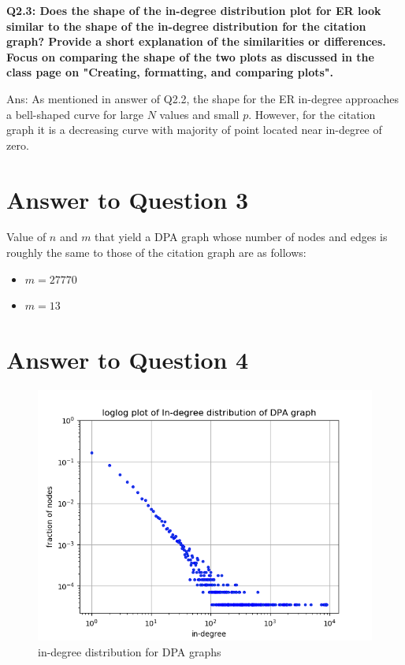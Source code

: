 \documentclass[a4paper]{article}
\begin{document}
\textbf{Q2.3: Does the shape of the in-degree distribution plot for ER look similar
to the shape of the in-degree distribution for the citation graph?
Provide a short explanation of the similarities or differences.
Focus on comparing the shape of the two plots as discussed in the class page on
"Creating, formatting, and comparing plots".}

Ans: As mentioned in answer of Q2.2, the shape for the ER in-degree approaches
a bell-shaped curve for large $N$ values and small $p$. However, for the citation
graph it is a decreasing curve with majority of point located near in-degree
of zero.

\section*{Answer to Question 3}
Value of $n$ and $m$ that yield a DPA graph whose number of nodes and edges is roughly the same to those of the citation graph are as follows:
\begin{itemize}
	\item $m = 27770$
	\item $m = 13$
\end{itemize}


\section*{Answer to Question 4}

\FloatBarrier
\begin{figure}[h]
	\centering 
	\includegraphics[scale = 0.9, clip=True, trim=0.5cm 0cm 0cm 0.5cm]{Q4_loglog_indegree_dist_dpa.png}
	\caption{in-degree distribution for DPA graphs}
\end{figure}
\FloatBarrier
\end{document}
